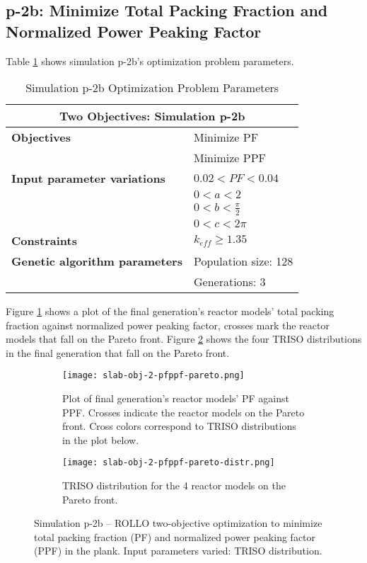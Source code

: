 \subsection{p-2b: Minimize Total Packing Fraction and Normalized Power Peaking Factor}
Table \ref{tab:simulationp2b} shows simulation p-2b's optimization problem parameters. 
\begin{table}[htbp!]
    \centering
    \onehalfspacing
    \caption{Simulation p-2b Optimization Problem Parameters}
	\label{tab:simulationp2b}
    \footnotesize
    \begin{tabular}{l|p{3cm}}
    \hline 
    \multicolumn{2}{c}{\textbf{Two Objectives: Simulation p-2b}} \\
    \hline 
    \textbf{Objectives} & Minimize PF \\
    & Minimize PPF \\
    \hline 
    \textbf{Input parameter variations} & $0.02<PF<0.04$ \\
    & $0<a<2$ \\
    & $0<b<\frac{\pi}{2}$ \\
    & $0<c<2\pi$ \\
    \hline
    \textbf{Constraints} & $k_{eff} \geq 1.35$\\ 
    \hline 
    \textbf{Genetic algorithm parameters} & Population size: 128 \\
    & Generations: 3 \\
    \hline
    \end{tabular}
\end{table}
Figure \ref{fig:slab-obj-2-pfppf-pareto} shows a plot of the final generation's reactor models' 
total packing fraction against normalized power peaking factor, crosses mark the reactor 
models that fall on the Pareto front.
Figure \ref{fig:slab-obj-2-pfppf-pareto-distr} shows the four TRISO distributions in 
the final generation that fall on the Pareto front. 
\begin{figure}[htbp!]
    \centering
    \begin{subfigure}{\textwidth}
        \texttt{[image: slab-obj-2-pfppf-pareto.png]}
        \caption{Plot of final generation's reactor models' PF against PPF. 
        Crosses indicate the reactor models on the Pareto front. Cross colors correspond  
        to TRISO distributions in the plot below.}
        \label{fig:slab-obj-2-pfppf-pareto} 
    \end{subfigure}
    \begin{subfigure}{\textwidth}
        \texttt{[image: slab-obj-2-pfppf-pareto-distr.png]}
        \caption{TRISO distribution for the 4 reactor models on the Pareto front.}
        \label{fig:slab-obj-2-pfppf-pareto-distr} 
    \end{subfigure}
    \caption{Simulation p-2b -- ROLLO two-objective optimization to minimize total packing fraction (PF) and  
    normalized power peaking factor (PPF) in the plank. Input parameters varied: 
    TRISO distribution.}
    \label{fig:slab-obj-2-pfppf}
\end{figure}
